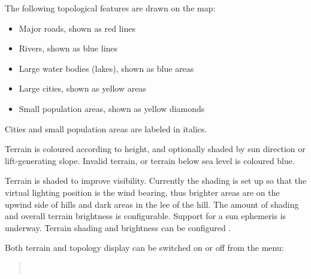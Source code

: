 The following topological features are drawn on the map:
\begin{itemize}
\item Major roads, shown as red lines
\item Rivers, shown as blue lines
\item Large water bodies (lakes), shown as blue areas
\item Large cities, shown as yellow areas
\item Small population areas, shown as yellow diamonds
\end{itemize}
Cities and small population areas are labeled in italics.

Terrain is coloured according to height, and optionally shaded by sun
direction or lift-generating slope.  Invalid terrain, or terrain below
sea level is coloured blue.

Terrain is shaded to improve visibility.  Currently the shading
is set up so that the virtual lighting position is the wind bearing,
thus brighter areas are on the upwind side of hills and dark areas in
the lee of the hill.  The amount of shading and overall terrain
brightness is configurable.  Support for a sun ephemeris is underway.
Terrain shading and brightness can be configured .

Both terrain and topology display can be switched on or off from the
menu:
\begin{quote}
\blink{}\blink{} \\
\blink{}\blink{}
\end{quote}

